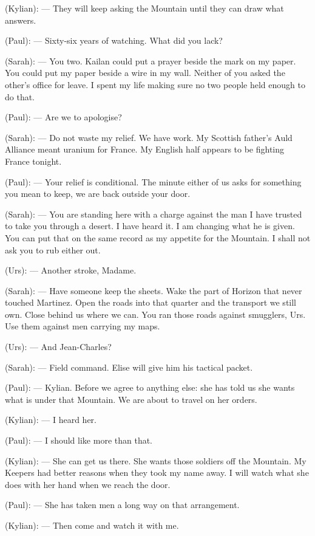 \begin{room}
(Kylian): --- They will keep asking the Mountain until they can draw what answers.

(Paul): --- Sixty-six years of watching. What did you lack?

(Sarah): --- You two. Kailan could put a prayer beside the mark on my paper. You could put my paper beside a wire in my wall. Neither of you asked the other's office for leave. I spent my life making sure no two people held enough to do that.

(Paul): --- Are we to apologise?

(Sarah): --- Do not waste my relief. We have work. My Scottish father's Auld Alliance meant uranium for France. My English half appears to be fighting France tonight.

(Paul): --- Your relief is conditional. The minute either of us asks for something you mean to keep, we are back outside your door.

(Sarah): --- You are standing here with a charge against the man I have trusted to take you through a desert. I have heard it. I am changing what he is given. You can put that on the same record as my appetite for the Mountain. I shall not ask you to rub either out.

(Urs): --- Another stroke, Madame.

(Sarah): --- Have someone keep the sheets. Wake the part of Horizon that never touched Martinez. Open the roads into that quarter and the transport we still own. Close behind us where we can. You ran those roads against smugglers, Urs. Use them against men carrying my maps.

(Urs): --- And Jean-Charles?

(Sarah): --- Field command. Elise will give him his tactical packet.

\centerline{}

(Paul): --- Kylian. Before we agree to anything else: she has told us she wants what is under that Mountain. We are about to travel on her orders.

(Kylian): --- I heard her.

(Paul): --- I should like more than that.

(Kylian): --- She can get us there. She wants those soldiers off the Mountain. My Keepers had better reasons when they took my name away. I will watch what she does with her hand when we reach the door.

(Paul): --- She has taken men a long way on that arrangement.

(Kylian): --- Then come and watch it with me.


\end{room}
